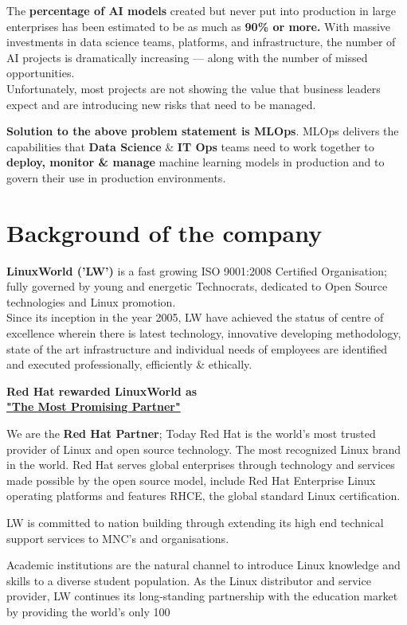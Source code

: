 \documentclass[12pt,oneside,a4paper]{report}
\begin{document}
The \textbf{percentage of AI models} created but never put into production in large enterprises has been estimated to be as much as \textbf{90\% or more.} With massive investments in data science teams, platforms, and infrastructure, the number of AI projects is dramatically increasing — along with the number of missed opportunities.\\Unfortunately, most projects are not showing the value that business leaders expect and are introducing new risks that need to be managed.

\textbf{Solution to the above problem statement is MLOps}. MLOps delivers the capabilities that \textbf{Data Science} \& \textbf{IT Ops} teams need to work together to \textbf{deploy, monitor \& manage} machine learning models in production and to govern their use in production environments.

\section{Background of the company}
\textbf{LinuxWorld ('LW')} is a fast growing ISO 9001:2008 Certified Organisation; fully governed by young and energetic Technocrats, dedicated to Open Source technologies and Linux promotion.\\
Since its inception in the year 2005, LW have achieved the status of centre of excellence wherein there is latest technology, innovative developing methodology, state of the art infrastructure and individual needs of employees are identified and executed professionally, efficiently \& ethically.
\begin{center}
\textbf{ Red Hat rewarded LinuxWorld as\\
\underline{\Large{"The Most Promising Partner"}}}
\end{center}
We are the \textbf{Red Hat Partner}; Today Red Hat is the world's most trusted provider of Linux and open source technology. The most recognized Linux brand in the world. Red Hat serves global enterprises through technology and services made possible by the open source model, include Red Hat Enterprise Linux operating platforms and features RHCE, the global standard Linux certification.

LW is committed to nation building through extending its high end technical support services to MNC's and organisations.

Academic institutions are the natural channel to introduce Linux knowledge and skills to a diverse student population. As the Linux distributor and service provider, LW continues its long-standing partnership with the education market by providing the world's only 100%
\end{document}
